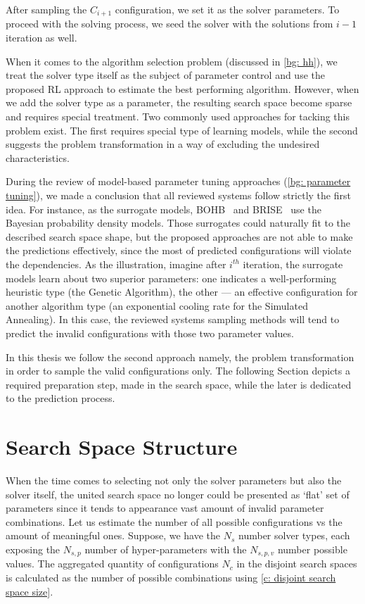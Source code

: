 After sampling the $C_{i+1}$ configuration, we set it as the solver parameters. To proceed with the solving process, we seed the solver with the solutions from $i-1$ iteration as well.

When it comes to the algorithm selection problem (discussed in \cref{bg: hh}), we treat the solver type itself as the subject of parameter control and use the proposed RL approach to estimate the best performing algorithm. However, when we add the solver type as a parameter, the resulting search space become sparse and requires special treatment. Two commonly used approaches for tacking this problem exist. The first requires special type of learning models, while the second suggests the problem transformation in a way of excluding the undesired characteristics.

During the review of model-based parameter tuning approaches (\cref{bg: parameter tuning}), we made a conclusion that all reviewed systems follow strictly the first idea. For instance, as the surrogate models, BOHB~\cite{falkner2018bohb} and BRISE~\cite{brise2spl} use the Bayesian probability density models. Those surrogates could naturally fit to the described search space shape, but the proposed approaches are not able to make the predictions effectively, since the most of predicted configurations will violate the dependencies. As the illustration, imagine after $i^{th}$ iteration, the surrogate models learn about two superior parameters: one indicates a well-performing heuristic type (the Genetic Algorithm), the other — an effective configuration for another algorithm type (an exponential cooling rate for the Simulated Annealing). In this case, the reviewed systems sampling methods will tend to predict the invalid configurations with those two parameter values.

In this thesis we follow the second approach namely, the problem transformation in order to sample the valid configurations only. The following Section depicts a required preparation step, made in the search space, while the later is dedicated to the prediction process.


\section{Search Space Structure}\label{concept:search space}
When the time comes to selecting not only the solver parameters but also the solver itself, the united search space no longer could be presented as `flat' set of parameters since it tends to appearance vast amount of invalid parameter combinations. Let us estimate the number of all possible configurations vs the amount of meaningful ones. Suppose, we have the $N_s$ number solver types, each exposing the $N_{s,p}$ number of hyper-parameters with the $N_{s,p,v}$ number possible values. The aggregated quantity of configurations $N_c$ in the disjoint search spaces is calculated as the number of possible combinations using \cref{c: disjoint search space size}.

